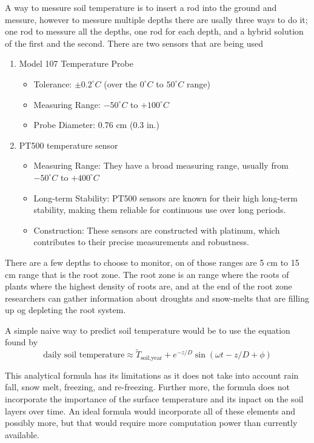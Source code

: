 A way to messure soil temperature is to insert a rod into the ground and messure, however to messure multiple depths there are usally three ways to do it; one rod to messure all the depths, one rod for each depth, and a hybrid solution of the first and the second. There are two sensors that are being used
\begin{enumerate}
	\item Model 107 Temperature Probe\cite{noauthor_107_nodate}
	\begin{itemize}
		\item Tolerance: $\pm0.2^\circ C$ (over the $0^\circ C$ to $50^\circ C$ range)
		\item Measuring Range: $-50^\circ C$ to $+100^\circ C$
		\item Probe Diameter: 0.76 cm (0.3 in.)
	\end{itemize}
	\item PT500 temperature sensor\cite{kamstrup_dokumentasjon_nodate}
	\begin{itemize}
		\item Measuring Range: They have a broad measuring range, usually from $-50^\circ C$ to $+400^\circ C$
		\item Long-term Stability: PT500 sensors are known for their high long-term stability, making them reliable for continuous use over long periods.
		\item Construction: These sensors are constructed with platinum, which contributes to their precise measurements and robustness.
	\end{itemize}
\end{enumerate}
There are a few depths to choose to monitor, on of those ranges are 5 cm to 15 cm range that is the root zone\cite{jones_sb_35_nodate}. The root zone is an range where the roots of plants where the highest density of roots are, and at the end of the root zone researchers can gather information about droughts and snow-melts that are filling up og depleting the root system. 

A simple naive way to predict soil temperature would be to use the equation found by \cite{van_wijk_wr_periodic_1963}
\begin{equation}
	\text{daily soil temperature} \approx \widetilde{T}_{\text{soil,year}} + e^{-z/D}\sin(\omega t - z/D + \phi)
\end{equation}

This analytical formula has its limitations as it does not take into account rain fall, snow melt, freezing, and re-freezing. Further more, the formula does not incorporate the importance of the surface temperature and its inpact on the soil layers over time. An ideal formula would incorporate all of these elements and possibly more, but that would require more computation power than currently available.

